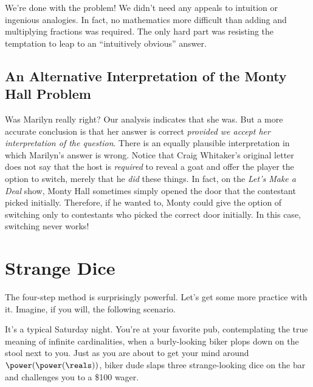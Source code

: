 We're done with the problem!  We didn't need any appeals to intuition
or ingenious analogies.  In fact, no mathematics more difficult than
adding and multiplying fractions was required.  The only hard part was
resisting the temptation to leap to an ``intuitively obvious'' answer.

\subsection{An Alternative Interpretation of the Monty Hall Problem}

Was Marilyn really right?  Our analysis indicates that she was.  But a
more accurate conclusion is that her answer is correct \emph{provided
  we accept her interpretation of the question}.  There is an equally
plausible interpretation in which Marilyn's answer is wrong.  Notice
that Craig Whitaker's original letter does not say that the host is
\emph{required} to reveal a goat and offer the player the option to
switch, merely that he \emph{did} these things.  In fact, on the
\emph{Let's Make a Deal} show, Monty Hall sometimes simply opened the
door that the contestant picked initially.  Therefore, if he wanted
to, Monty could give the option of switching only to contestants who
picked the correct door initially.  In this case, switching never
works!


\begin{problems}
\classproblems
{}

\homeworkproblems
{}

\end{problems}

\section{Strange Dice}

The four-step method is surprisingly powerful.  Let's get some more
practice with it.  Imagine, if you will, the following scenario.

It's a typical Saturday night.  You're at your favorite pub,
contemplating the true meaning of infinite cardinalities, when a
burly-looking biker plops down on the stool next to you.  Just as you
are about to get your mind around~$\power(\power(\reals))$, biker dude
slaps three strange-looking dice on the bar and challenges you to a
\$100 wager.

